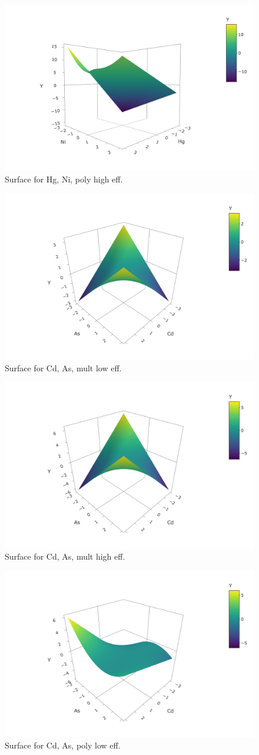 \documentclass[12pt, twoside]{amherstthesis}
\begin{document}
\begin{figure}

{\centering \includegraphics[width=0.5\linewidth]{figures/surfaces/ap2} 

}

\caption{Surface for Hg, Ni, poly high eff.}\label{fig:ap2}
\end{figure}
\begin{figure}

{\centering \includegraphics[width=0.5\linewidth]{figures/surfaces/bm1} 

}

\caption{Surface for Cd, As, mult low eff.}\label{fig:bm1}
\end{figure}
\begin{figure}

{\centering \includegraphics[width=0.5\linewidth]{figures/surfaces/bm2} 

}

\caption{Surface for Cd, As, mult high eff.}\label{fig:bm2}
\end{figure}
\begin{figure}

{\centering \includegraphics[width=0.5\linewidth]{figures/surfaces/bp1} 

}

\caption{Surface for Cd, As, poly low eff.}\label{fig:bp1}
\end{figure}
\end{document}
